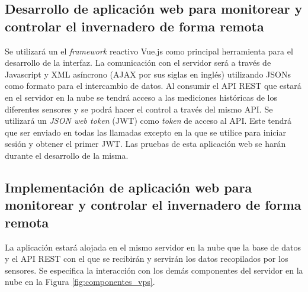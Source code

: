\subsection{Desarrollo de aplicación web para monitorear y controlar el invernadero de forma remota}
Se utilizará un el \textit{framework} reactivo Vue.js como principal herramienta para el desarrollo de la interfaz. La comunicación con el servidor será a través de Javascript y XML asíncrono (AJAX por sus siglas en inglés) utilizando JSONs como formato para el intercambio de datos. Al consumir el API REST que estará en el servidor en la nube se tendrá acceso a las mediciones históricas de los diferentes sensores y se podrá hacer el control a través del mismo API. Se utilizará un \textit{JSON web token} (JWT) como \textit{token} de acceso al API. Este tendrá que ser enviado en todas las llamadas excepto en la que se utilice para iniciar sesión y obtener el primer JWT. Las pruebas de esta aplicación web se harán durante el desarrollo de la misma.

\subsection{Implementación de aplicación web para monitorear y controlar el invernadero de forma remota}
La aplicación estará alojada en el mismo servidor en la nube que la base de datos y el API REST con el que se recibirán y servirán los datos recopilados por los sensores. Se especifica la interacción con los demás componentes del servidor en la nube en la Figura \ref{fig:componentes_vps}.






